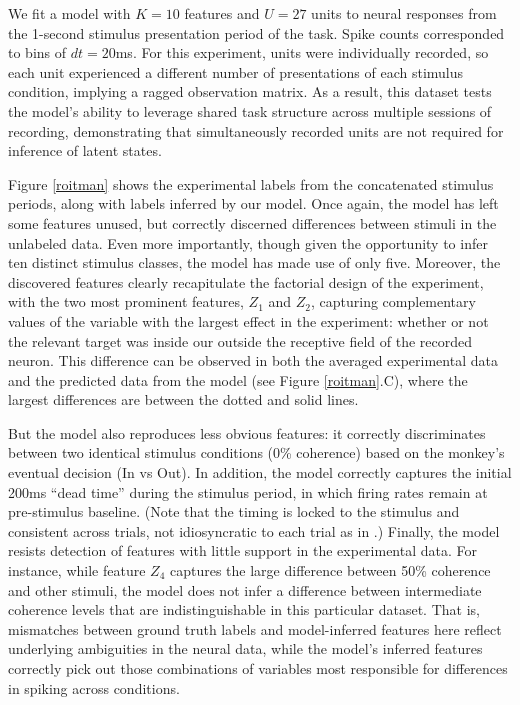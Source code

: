 \documentclass[12pt,a4paper]{article}
\begin{document}
We fit a model with $K = 10$ features and $U = 27$ units to neural responses from the 1-second stimulus presentation period of the task. Spike counts corresponded to bins of $dt = 20$ms. For this experiment, units were individually recorded, so each unit experienced a different number of presentations of each stimulus condition, implying a ragged observation matrix. As a result, this dataset tests the model's ability to leverage shared task structure across multiple sessions of recording, demonstrating that simultaneously recorded units are not required for inference of latent states.

Figure \ref{roitman} shows the experimental labels from the concatenated stimulus periods, along with labels inferred by our model. Once again, the model has left some features unused, but correctly discerned differences between stimuli in the unlabeled data. Even more importantly, though given the opportunity to infer ten distinct stimulus classes, the model has made use of only five. Moreover, the discovered features clearly recapitulate the factorial design of the experiment, with the two most prominent features, $Z_1$ and $Z_2$, capturing complementary values of the variable with the largest effect in the experiment: whether or not the relevant target was inside our outside the receptive field of the recorded neuron. This difference can be observed in both the averaged experimental data and the predicted data from the model (see Figure \ref{roitman}.C), where the largest differences are between the dotted and solid lines.

But the model also reproduces less obvious features: it correctly discriminates between two identical stimulus conditions (0\% coherence) based on the monkey's eventual decision (In vs Out). In addition, the model correctly captures the initial 200ms ``dead time'' during the stimulus period, in which firing rates remain at pre-stimulus baseline. (Note that the timing is locked to the stimulus and consistent across trials, not idiosyncratic to each trial as in \cite{Latimer2015-pb}.) Finally, the model resists detection of features with little support in the experimental data. For instance, while feature $Z_4$ captures the large difference between 50\% coherence and other stimuli, the model does not infer a difference between intermediate coherence levels that are indistinguishable in this particular dataset. That is, mismatches between ground truth labels and model-inferred features here reflect underlying ambiguities in the neural data, while the model's inferred features correctly pick out those combinations of variables most responsible for differences in spiking across conditions.
\end{document}
